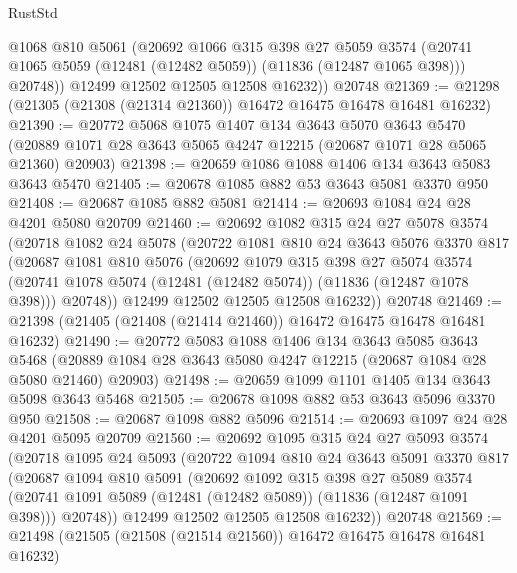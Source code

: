 \begin{lexlean}{RustStd}
\begin{coremodule}
          @1068
          @810
          @5061
          (@20692
            @1066
            @315
            @398
            @27
            @5059
            @3574
            (@20741 @1065 @5059 (@12481 (@12482 @5059)) (@11836 (@12487 @1065 @398)))
            @20748))
        @12499
        @12502
        @12505
        @12508
        @16232))
    @20748
@21369 := @21298 (@21305 (@21308 (@21314 @21360)) @16472 @16475 @16478 @16481 @16232)
@21390 := @20772
    @5068
    @1075
    @1407
    @134
    @3643
    @5070
    @3643
    @5470
    (@20889 @1071 @28 @3643 @5065 @4247 @12215 (@20687 @1071 @28 @5065 @21360) @20903)
@21398 := @20659 @1086 @1088 @1406 @134 @3643 @5083 @3643 @5470
@21405 := @20678 @1085 @882 @53 @3643 @5081 @3370 @950
@21408 := @20687 @1085 @882 @5081
@21414 := @20693 @1084 @24 @28 @4201 @5080 @20709
@21460 := @20692
    @1082
    @315
    @24
    @27
    @5078
    @3574
    (@20718
      @1082
      @24
      @5078
      (@20722
        @1081
        @810
        @24
        @3643
        @5076
        @3370
        @817
        (@20687
          @1081
          @810
          @5076
          (@20692
            @1079
            @315
            @398
            @27
            @5074
            @3574
            (@20741 @1078 @5074 (@12481 (@12482 @5074)) (@11836 (@12487 @1078 @398)))
            @20748))
        @12499
        @12502
        @12505
        @12508
        @16232))
    @20748
@21469 := @21398 (@21405 (@21408 (@21414 @21460)) @16472 @16475 @16478 @16481 @16232)
@21490 := @20772
    @5083
    @1088
    @1406
    @134
    @3643
    @5085
    @3643
    @5468
    (@20889 @1084 @28 @3643 @5080 @4247 @12215 (@20687 @1084 @28 @5080 @21460) @20903)
@21498 := @20659 @1099 @1101 @1405 @134 @3643 @5098 @3643 @5468
@21505 := @20678 @1098 @882 @53 @3643 @5096 @3370 @950
@21508 := @20687 @1098 @882 @5096
@21514 := @20693 @1097 @24 @28 @4201 @5095 @20709
@21560 := @20692
    @1095
    @315
    @24
    @27
    @5093
    @3574
    (@20718
      @1095
      @24
      @5093
      (@20722
        @1094
        @810
        @24
        @3643
        @5091
        @3370
        @817
        (@20687
          @1094
          @810
          @5091
          (@20692
            @1092
            @315
            @398
            @27
            @5089
            @3574
            (@20741 @1091 @5089 (@12481 (@12482 @5089)) (@11836 (@12487 @1091 @398)))
            @20748))
        @12499
        @12502
        @12505
        @12508
        @16232))
    @20748
@21569 := @21498 (@21505 (@21508 (@21514 @21560)) @16472 @16475 @16478 @16481 @16232)

\end{coremodule}
\end{lexlean}
